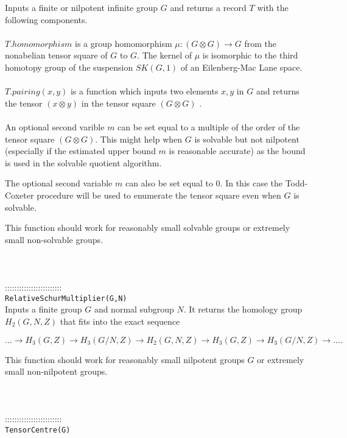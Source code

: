 \documentclass[a4paper,11pt]{report}
\begin{document}
{ Inputs a finite or nilpotent infinite group $G$ and returns a record $T$ with the following components. \\
 \\
 $T.homomorphism$ is a group homomorphism ${\ensuremath{\mu}} : (G \otimes G) \longrightarrow G$ from the nonabelian tensor square of $G$ to $G$. The kernel of ${\ensuremath{\mu}}$ is isomorphic to the third homotopy group of the suspension $SK(G,1)$ of an Eilenberg-Mac Lane space. \\
 \\
 $T.pairing(x,y)$ is a function which inputs two elements $x, y$ in $G$ and returns the tensor $(x \otimes y)$ in the tensor square $(G \otimes G)$ . \\
 \\
 An optional second varible $m$ can be set equal to a multiple of the order of the tensor square $(G \otimes G)$. This might help when $G$ is solvable but not nilpotent (especially if the estimated upper bound $m$ is reasonable accurate) as the bound is used in the solvable quotient
algorithm. 

 The optional second variable $m$ can also be set equal to $0$. In this case the Todd-Coxeter procedure will be used to enumerate the tensor
square even when $G$ is solvable. 

 This function should work for reasonably small solvable groups or extremely
small non-solvable groups. \\
 \\
 \\
 \\
 ::::::::::::::::::::::::\\
 \texttt{RelativeSchurMultiplier(G,N) }\\
 

 Inputs a finite group $G$ and normal subgroup $N$. It returns the homology group $H_2(G,N,Z)$ that fits into the exact sequence 

 $\ldots\longrightarrow H_3(G,Z) \longrightarrow H_3(G/N,Z) \longrightarrow
H_2(G,N,Z) \longrightarrow H_3(G,Z) \longrightarrow H_3(G/N,Z) \longrightarrow
\ldots. $ 

 This function should work for reasonably small nilpotent groups $G$ or extremely small non-nilpotent groups. \\
 \\
 \\
 \\
 ::::::::::::::::::::::::\\
 \texttt{TensorCentre(G) }\\
 

}
\end{document}
